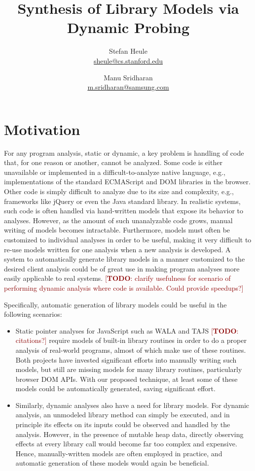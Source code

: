\documentclass[]{article}
\title{Synthesis of Library Models via Dynamic Probing}
\author{
  Stefan Heule\\\url{sheule@cs.stanford.edu}
  \and
  Manu Sridharan\\\url{m.sridharan@samsung.com}
}
\newcommand{\todo}[1]{{\textcolor{DarkRed}{ [\textbf{TODO}: #1]}}}
\begin{document}
\maketitle



\section{Motivation}

For any program analysis, static or dynamic, a key problem is handling of code
that, for one reason or another, cannot be analyzed.  Some code is either
unavailable or implemented in a difficult-to-analyze native language, e.g.,
implementations of the standard ECMAScript and DOM libraries in the browser.
Other code is simply difficult to analyze due to its size and complexity, e.g.,
frameworks like jQuery or even the Java standard library.  In realistic systems,
such code is often handled via hand-written models that expose its behavior to
analyses.  However, as the amount of such unanalyzable code grows, manual
writing of models becomes intractable. Furthermore, models must often be customized to
individual analyses in order to be useful, making it very difficult to re-use
models written for one analysis when a new analysis is developed.  A system to
automatically generate library models in a manner customized to the desired
client analysis could be of great use in making program analyses more easily
applicable to real systems.
\todo{clarify usefulness for scenario of performing
  dynamic analysis where code is available.  Could provide speedups?}

Specifically, automatic generation of library models could be useful in the following scenarios:
\begin{itemize}
\item Static pointer analyses for JavaScript such as WALA and TAJS
  \todo{citations?}  require models of built-in library routines in
  order to do a proper analysis of real-world programs, almost of
  which make use of these routines.  Both projects have invested
  significant efforts into manually writing such models, but still are
  missing models for many library routines, particularly browser DOM
  APIs.  With our proposed technique, at least some of these models
  could be automatically generated, saving significant effort.
\item Similarly, dynamic analyses also have a need for library models.
  For dynamic analysis, an unmodeled library method can simply be
  executed, and in principle its effects on its inputs could be
  observed and handled by the analysis.  However, in the presence of
  mutable heap data, directly observing effects at every library call
  would become far too complex and expensive.  Hence, manually-written
  models are often employed in practice, and automatic generation of
  these models would again be beneficial.
\end{itemize}
\end{document}
